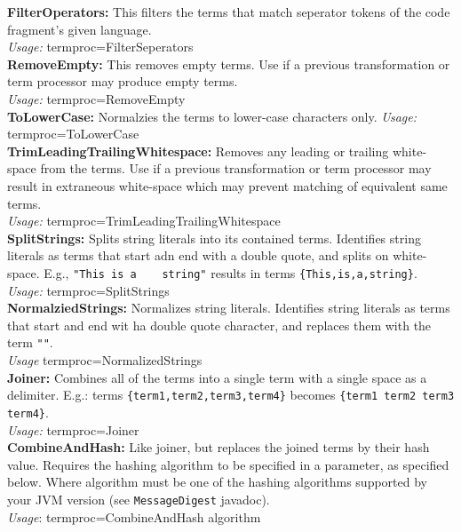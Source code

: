 \documentclass[]{article}
\begin{document}
	\noindent\textbf{FilterOperators:} This filters the terms that match seperator tokens of the code fragment's given language.\\
	\noindent\textit{Usage:} termproc=FilterSeperators\\
	
	\noindent\textbf{RemoveEmpty:} This removes empty terms.  Use if a previous transformation or term processor may produce empty terms.\\
	\noindent\textit{Usage:} termproc=RemoveEmpty\\
	
	\noindent\textbf{ToLowerCase:} Normalzies the terms to lower-case characters only.
	\noindent\textit{Usage:} termproc=ToLowerCase\\
	
	\noindent\textbf{TrimLeadingTrailingWhitespace:} Removes any leading or trailing white-space from the terms.  Use if a previous transformation or term processor may result in extraneous white-space which may prevent matching of equivalent same terms.\\
	\noindent\textit{Usage:} termproc=TrimLeadingTrailingWhitespace\\
	
	\noindent\textbf{SplitStrings:} Splits string literals into its contained terms.  Identifies string literals as terms that start adn end with a double quote, and splits on white-space.  E.g., \verb|"This is a    string"| results in terms \verb|{This,is,a,string}|.\\
	\noindent\textit{Usage:} termproc=SplitStrings\\
	
	\noindent\textbf{NormalziedStrings:} Normalizes string literals.  Identifies string literals as terms that start and end wit ha double quote character, and replaces them with the term \verb|""|.\\
	\noindent\textit{Usage} termproc=NormalizedStrings\\
	
	\noindent\textbf{Joiner:} Combines all of the terms into a single term with a single space as a delimiter.  E.g.: terms \verb|{term1,term2,term3,term4}| becomes \verb|{term1 term2 term3 term4}|.\\
	\noindent\textit{Usage:} termproc=Joiner\\
	
	\noindent\textbf{CombineAndHash:} Like joiner, but replaces the joined terms by their hash value.  Requires the hashing algorithm to be specified in a parameter, as specified below.  Where algorithm must be one of the hashing algorithms supported by your JVM version (see \verb|MessageDigest| javadoc).\\
	\noindent\textit{Usage}: termproc=CombineAndHash algorithm
	
\end{document}
